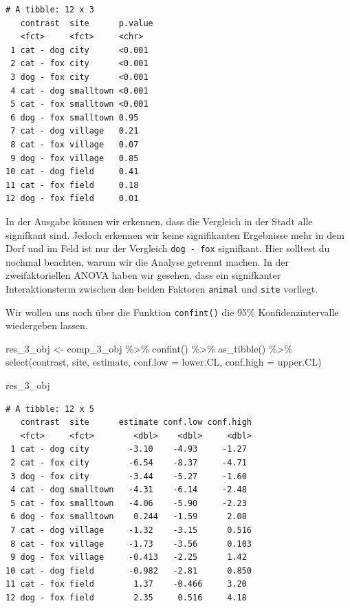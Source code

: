 \documentclass[
  letterpaper,
]{scrbook}
\newenvironment{Shaded}{\begin{snugshade}}{\end{snugshade}}
\newcommand{\AttributeTok}[1]{\textcolor[rgb]{0.40,0.45,0.13}{#1}}
\newcommand{\FunctionTok}[1]{\textcolor[rgb]{0.28,0.35,0.67}{#1}}
\newcommand{\NormalTok}[1]{\textcolor[rgb]{0.00,0.23,0.31}{#1}}
\newcommand{\OtherTok}[1]{\textcolor[rgb]{0.00,0.23,0.31}{#1}}
\newcommand{\SpecialCharTok}[1]{\textcolor[rgb]{0.37,0.37,0.37}{#1}}
\begin{document}
\begin{verbatim}
# A tibble: 12 x 3
   contrast  site      p.value
   <fct>     <fct>     <chr>  
 1 cat - dog city      <0.001 
 2 cat - fox city      <0.001 
 3 dog - fox city      <0.001 
 4 cat - dog smalltown <0.001 
 5 cat - fox smalltown <0.001 
 6 dog - fox smalltown 0.95   
 7 cat - dog village   0.21   
 8 cat - fox village   0.07   
 9 dog - fox village   0.85   
10 cat - dog field     0.41   
11 cat - fox field     0.18   
12 dog - fox field     0.01   
\end{verbatim}

In der Ausgabe können wir erkennen, dass die Vergleich in der Stadt alle
signifkant sind. Jedoch erkennen wir keine signifikanten Ergebnisse mehr
in dem Dorf und im Feld ist nur der Vergleich \texttt{dog\ -\ fox}
signifkant. Hier solltest du nochmal beachten, warum wir die Analyse
getrennt machen. In der zweifaktoriellen ANOVA haben wir gesehen, dass
ein signifkanter Interaktionsterm zwischen den beiden Faktoren
\texttt{animal} und \texttt{site} vorliegt.

Wir wollen uns noch über die Funktion \texttt{confint()} die 95\%
Konfidenzintervalle wiedergeben lassen.

\begin{Shaded}
\begin{Highlighting}[]
\NormalTok{res\_3\_obj }\OtherTok{\textless{}{-}}\NormalTok{ comp\_3\_obj }\SpecialCharTok{\%\textgreater{}\%} 
  \FunctionTok{confint}\NormalTok{() }\SpecialCharTok{\%\textgreater{}\%} 
  \FunctionTok{as\_tibble}\NormalTok{() }\SpecialCharTok{\%\textgreater{}\%} 
  \FunctionTok{select}\NormalTok{(contrast, site, estimate, }\AttributeTok{conf.low =}\NormalTok{ lower.CL, }\AttributeTok{conf.high =}\NormalTok{ upper.CL) }

\NormalTok{res\_3\_obj}
\end{Highlighting}
\end{Shaded}

\begin{verbatim}
# A tibble: 12 x 5
   contrast  site      estimate conf.low conf.high
   <fct>     <fct>        <dbl>    <dbl>     <dbl>
 1 cat - dog city        -3.10    -4.93     -1.27 
 2 cat - fox city        -6.54    -8.37     -4.71 
 3 dog - fox city        -3.44    -5.27     -1.60 
 4 cat - dog smalltown   -4.31    -6.14     -2.48 
 5 cat - fox smalltown   -4.06    -5.90     -2.23 
 6 dog - fox smalltown    0.244   -1.59      2.08 
 7 cat - dog village     -1.32    -3.15      0.516
 8 cat - fox village     -1.73    -3.56      0.103
 9 dog - fox village     -0.413   -2.25      1.42 
10 cat - dog field       -0.982   -2.81      0.850
11 cat - fox field        1.37    -0.466     3.20 
12 dog - fox field        2.35     0.516     4.18 
\end{verbatim}
\end{document}
